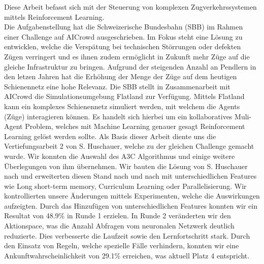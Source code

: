 Diese Arbeit befasst sich mit der Steuerung von komplexen Zugverkehrssystemen mittels Reinforcement Learning.\\
Die Aufgabenstellung hat die Schweizerische Bundesbahn (SBB) im Rahmen einer Challenge auf AICrowd ausgeschrieben.
Im Fokus steht eine Lösung zu entwicklen, welche die Verspätung bei technischen Störrungen oder defekten Zügen verringert und es ihnen zudem ermöglicht in Zukunft mehr Züge auf die gleiche Infrastruktur zu bringen.
Aufgrund der steigenden Anzahl an Pendlern in den letzen Jahren hat die Erhöhung der Menge der Züge auf dem heutigen Schienennetz eine hohe Relevanz.
Die SBB stellt in Zusammenarbeit mit AICrowd die Simulationsumgebung Flatland zur Verfügung. Mittels Flatland kann ein komplexes Schienennetz simuliert werden, mit welchem die Agents (Züge) interagieren können.
Es handelt sich hierbei um ein kollaboratives Muli-Agent Problem, welches mit Machine Learning genauer gesagt Reinforcement Learning gelöst werden sollte.
Als Basis dieser Arbeit diente uns die Vertiefungsarbeit 2 von S. Huschauer, welche zu der gleichen Challenge gemacht wurde.
Wir konnten die Auswahl des A3C Algorithmus und einige weitere Überlegungen von ihm übernehmen.
Wir bauten die Lösung von S. Huschauer nach und erweiterten diesen Stand nach und nach mit unterschiedlichen Features wie Long short-term memory, Curriculum Learning oder Parallelisierung.
Wir kontrollierten unsere Änderungen mittels Experimenten, welche die Auswirkungen aufzeigten.
Durch das Hinzufügen von unterschiedlichen Features konnten wir ein Resultat von 48.9\% in Runde 1 erzielen.
In Runde 2 veränderten wir den Aktionspace, was die Anzahl Abfragen vom neuronalen Netzwerk deutlich reduzierte. Dies verbesserte die Laufzeit sowie den Lernfortschritt stark.
Durch den Einsatz von Regeln, welche spezielle Fälle verhindern, konnten wir eine Ankunftwahrscheinlichkeit von 29.1\% erreichen, was aktuell Platz 4 entspricht.

